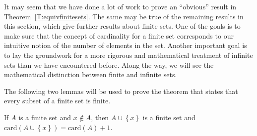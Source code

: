 It may seem that we have done a lot of work to prove an ``obvious'' result in 
Theorem~\ref{T:equivfinitesets}.  The same may be true of the remaining results in this section, which give further results about finite sets.  One of the goals is to make sure that the concept of cardinality for a finite set corresponds to our intuitive notion of the number of elements in the set.  Another important goal is to lay the groundwork for a more rigorous and mathematical treatment of infinite sets than we have encountered before.  Along the way, we will see the mathematical distinction between finite and infinite sets.

The following two lemmas will be used to prove the theorem that states that every subset of a finite set is finite.

\begin{lemma} \label{L:addone}
If $A$ is a finite set and $x \notin A$, then $A \cup \left\{ x \right\}$ is a finite set and  
$\text{card} \!\left( A \cup \left\{ x \right\} \right) = \text{card}( A ) + 1$.
\end{lemma}
%
